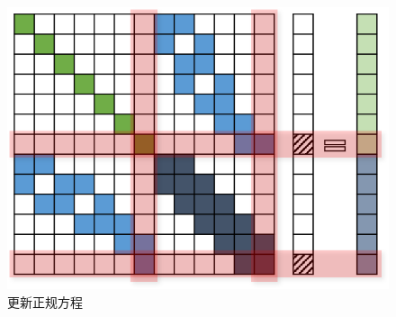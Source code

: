 \begin{figure}[htb!]
    \centering
    \includegraphics[scale=1]{figs/normal_eq_update.png}
    \caption{更新正规方程}
    \label{fig:normal_eq_update}
\end{figure}
